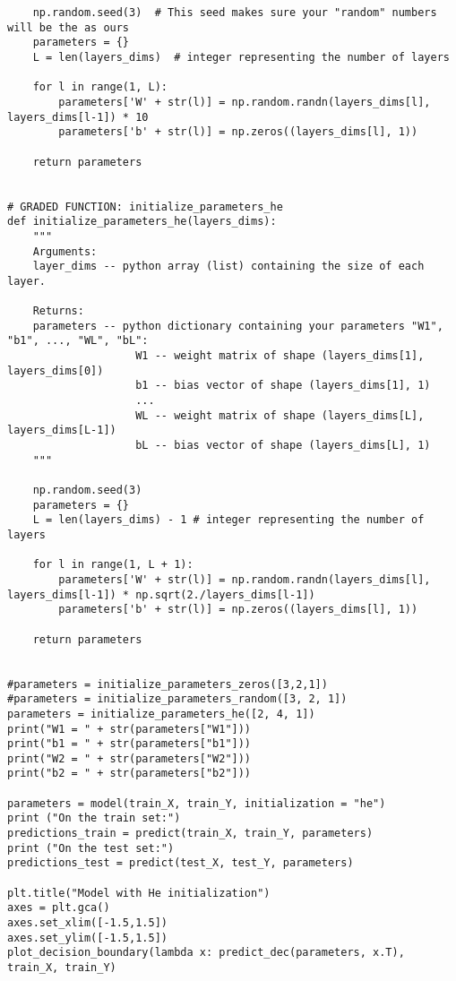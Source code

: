 \begin{verbatim}
    np.random.seed(3)  # This seed makes sure your "random" numbers will be the as ours
    parameters = {}
    L = len(layers_dims)  # integer representing the number of layers
    
    for l in range(1, L):
        parameters['W' + str(l)] = np.random.randn(layers_dims[l], layers_dims[l-1]) * 10
        parameters['b' + str(l)] = np.zeros((layers_dims[l], 1))

    return parameters


# GRADED FUNCTION: initialize_parameters_he
def initialize_parameters_he(layers_dims):
    """
    Arguments:
    layer_dims -- python array (list) containing the size of each layer.
    
    Returns:
    parameters -- python dictionary containing your parameters "W1", "b1", ..., "WL", "bL":
                    W1 -- weight matrix of shape (layers_dims[1], layers_dims[0])
                    b1 -- bias vector of shape (layers_dims[1], 1)
                    ...
                    WL -- weight matrix of shape (layers_dims[L], layers_dims[L-1])
                    bL -- bias vector of shape (layers_dims[L], 1)
    """
    
    np.random.seed(3)
    parameters = {}
    L = len(layers_dims) - 1 # integer representing the number of layers
     
    for l in range(1, L + 1):
        parameters['W' + str(l)] = np.random.randn(layers_dims[l], layers_dims[l-1]) * np.sqrt(2./layers_dims[l-1])
        parameters['b' + str(l)] = np.zeros((layers_dims[l], 1))
        
    return parameters


#parameters = initialize_parameters_zeros([3,2,1])
#parameters = initialize_parameters_random([3, 2, 1])
parameters = initialize_parameters_he([2, 4, 1])
print("W1 = " + str(parameters["W1"]))
print("b1 = " + str(parameters["b1"]))
print("W2 = " + str(parameters["W2"]))
print("b2 = " + str(parameters["b2"]))

parameters = model(train_X, train_Y, initialization = "he")
print ("On the train set:")
predictions_train = predict(train_X, train_Y, parameters)
print ("On the test set:")
predictions_test = predict(test_X, test_Y, parameters)

plt.title("Model with He initialization")
axes = plt.gca()
axes.set_xlim([-1.5,1.5])
axes.set_ylim([-1.5,1.5])
plot_decision_boundary(lambda x: predict_dec(parameters, x.T), train_X, train_Y)
\end{verbatim}
\clearpage